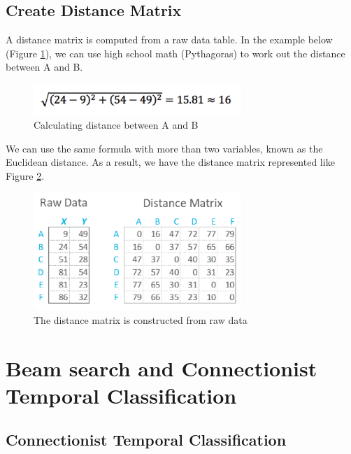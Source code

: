 
\subsection{Create Distance Matrix}

A distance matrix is computed from a raw data table. In the example below (Figure \ref{fig:Chap3-DM_Formula}), we can use high school math (Pythagoras) to work out the distance between A and B.

\begin{figure}[H]
	\centering
	\includegraphics[width=0.7\textwidth]{img/Chap3/DM_Formula}
	\caption{ Calculating distance between A and B}
	\label{fig:Chap3-DM_Formula}
\end{figure}

We can use the same formula with more than two variables, known as the Euclidean distance. As a result, we have the distance matrix represented like Figure \ref{fig:Chap3-DM-Raw}.

\begin{figure}[H]
	\centering
	\includegraphics[width=0.7\textwidth]{img/Chap3/DM-Raw}
	\caption{ The distance matrix is constructed from raw data }
	\label{fig:Chap3-DM-Raw}
\end{figure}

\section{Beam search and Connectionist Temporal Classification}
\subsection{Connectionist Temporal Classification}

